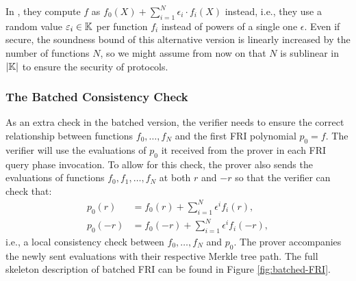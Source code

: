 \begin{remark}
  In \cite{EPRINT:BCIKS20}, they compute $f$ as $f_0(X) + \sum_{i=1}^N \epsilon_i \cdot f_i(X)$ instead, i.e., they use a random value $\varepsilon_i \in \mathbb{K}$ per function $f_i$ instead of powers of a single one $\epsilon$. Even if secure, the soundness bound of this alternative version is linearly increased by the number of functions $N$, so we might assume from now on that $N$ is sublinear in $|\mathbb{K}|$ to ensure the security of protocols.
\end{remark}

\subsubsection*{The Batched Consistency Check}

As an extra check in the batched version, the verifier needs to ensure the correct relationship between functions $f_0,\dots,f_N$ and the first FRI polynomial $p_0 = f$. The verifier will use the evaluations of $p_0$ it received from the prover in each FRI query phase invocation. To allow for this check, the prover also sends the evaluations of functions $f_0,f_1,\dots,f_N$ at both $r$ and $-r$ so that the verifier can check that:
\begin{align*}
  p_0(r) &= f_0(r) + \sum_{i=1}^N \epsilon^i f_i(r), \\
  p_0(-r) &= f_0(-r) + \sum_{i=1}^N \epsilon^i f_i(-r),
\end{align*}
i.e., a local consistency check between $f_0,\dots,f_N$ and $p_0$. The prover accompanies the newly sent evaluations with their respective Merkle tree path. The full skeleton description of batched FRI can be found in Figure \ref{fig:batched-FRI}.

